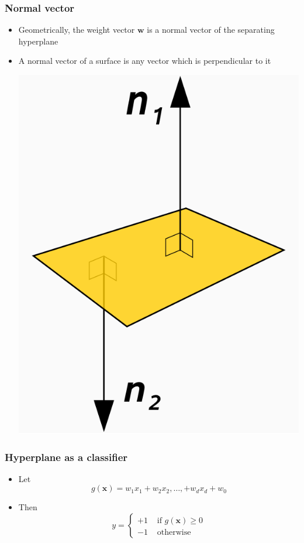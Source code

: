 \documentclass[14pt,mathserif]{beamer}
\newcommand{\x}{\mathbf{x}}
\newcommand{\w}{\mathbf{w}}
\begin{document}
\begin{frame}
 \frametitle{Normal vector}
\begin{itemize}
\item Geometrically, the weight vector $\w$ is a \alert{normal vector}
  of the separating hyperplane
\item A normal vector of a surface is any vector which is
  perpendicular to it
\begin{center}
 \includegraphics[scale=0.2]{Normal_vectors2.png}
 \end{center}
\end{itemize}
\end{frame}


 \begin{frame}\frametitle{Hyperplane as a classifier}
   \begin{itemize}
   \item Let \[
     g(\x) =  w_1x_1 + w_2x_2, \ldots, + w_dx_d + w_0
     \]
 \item Then
   \[ y = 
   \begin{cases}
    +1 & \text{ if } g(\x) \geq 0\\
    -1 & \text{ otherwise }
   \end{cases}
 \]
   \end{itemize}
 \end{frame}
\end{document}
